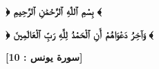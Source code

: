 
\chapter*{}
\thispagestyle{empty}
\vfill
\begin{center}\bfseries\Large
	\textarabic{﴿ بِسْمِ ٱللّٰهِ ٱلرَّحْمَٰنِ ٱلرَّحِيمِ ﴾}
\end{center}
\begin{Arabic}
	\begin{center}\bfseries\huge
		﴿ وَآخِرُ دَعْوَاهُمْ أَنِ ٱلْحَمْدُ لِلَّهِ رَبِّ ٱلْعَالَمِينَ ﴾
	\end{center}
	\hfill \textbf{[سورة يونس : 10]}
\end{Arabic}
\vfill